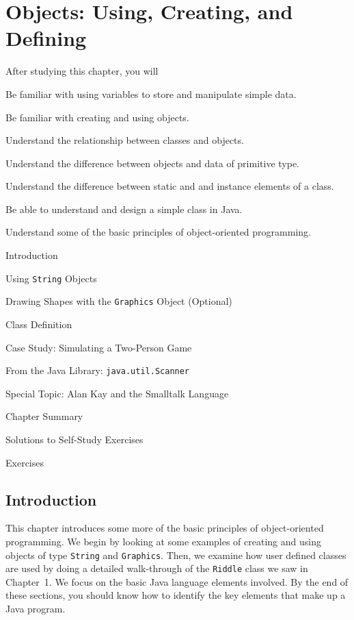 
\setcounter{SSTUDYcount}{1}
\setcounter{chapter}{1}
\chapter{Objects: Using, Creating, and Defining}
\label{chapter-objects}


\CObegin
{}
\noindent After studying this chapter, you will
\begin{COBL}
\item Be familiar with using variables to store and manipulate simple data.
\item Be familiar with creating and using objects.
\item Understand the relationship between classes and objects.
\item Understand the difference between objects and data of primitive type.
\item Understand the difference between static and and instance 
elements of a class.
\item Be able to understand and design a simple class in Java.
\item Understand some of the basic principles of object-oriented programming.

\end{COBL}

\begin{COL}
\item Introduction
\item Using {\tt String} Objects
\item Drawing Shapes with the {\tt Graphics} Object (Optional)
\item Class Definition
\item Case Study: Simulating a Two-Person Game
\item {From the Java Library: {\tt java.util.Scanner}}
\item[]{{\color{cyan}Special Topic:} Alan Kay and the Smalltalk Language}
\par\small\item[] Chapter Summary
\par\small\item[] Solutions to Self-Study Exercises
\par\small\item[] Exercises
\end{COL}
\COend

\section{Introduction}
\noindent This chapter introduces some more of the basic principles of
object-oriented programming.  We begin
by looking at some examples of creating and using objects of 
type {\tt String} and {\tt Graphics}.
Then, we examine how user defined classes are used by doing a detailed
walk-through of the {\tt Riddle} class we saw in Chapter~1.
We focus on the basic Java language elements involved.  By the end of 
these sections,
you should know how to identify the key elements that make up a Java program.

